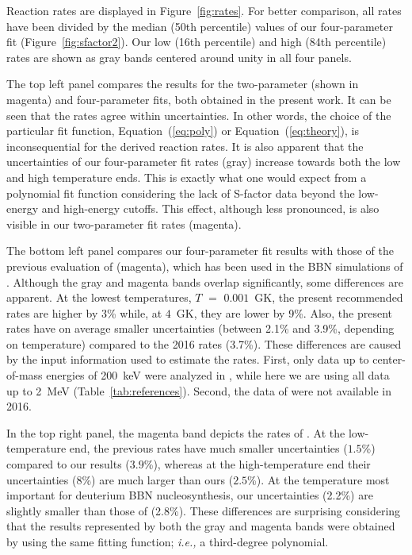 \documentclass[twocolumn]{aastex63}
\begin{document}
Reaction rates are displayed in Figure~\ref{fig:rates}. For better comparison, all rates have been divided by the median (50th percentile) values of our four-parameter fit (Figure~\ref{fig:sfactor2}). Our low (16th percentile) and high (84th percentile) rates are shown as gray bands centered around unity in all four panels. 

The top left panel compares the results for the two-parameter (shown in magenta) and four-parameter fits, both obtained in the present work. It can be seen that the rates agree within uncertainties. In other words, the choice of the particular fit function, Equation~(\ref{eq:poly}) or Equation~(\ref{eq:theory}), is inconsequential for the derived reaction rates. It is also apparent that the uncertainties of our four-parameter fit rates (gray) increase towards both the low and high temperature ends. This is exactly what one would expect from a polynomial fit function considering the lack of S-factor data beyond the low-energy and high-energy cutoffs. This effect, although less pronounced, is also visible in our two-parameter fit rates (magenta).

The bottom left panel compares our four-parameter fit results with those of the previous evaluation of \citet{iliadis16} (magenta), which has been used in the BBN simulations of \citet{Pitrou2018}. Although the gray and magenta bands overlap significantly, some differences are apparent. At the lowest temperatures, $T$ $=$ $0.001$~GK, the present recommended rates are higher by 3\% while, at $4$~GK, they are lower by 9\%. Also, the present rates have on average smaller uncertainties (between 2.1\% and 3.9\%, depending on temperature) compared to the 2016 rates (3.7\%). These differences are caused by the input information used to estimate the rates. First, only data up to center-of-mass energies of 200~keV were analyzed in \citet{iliadis16}, while here we are using all data up to 2~MeV (Table~\ref{tab:references}). Second, the data of \citet{Turkat21,Mossa20,Tisma:2019ug} were not available in 2016. 

In the top right panel, the magenta band depicts the rates of \citet{Mossa20}. At the low-temperature end, the previous rates have much smaller uncertainties ($1.5$\%) compared to our results ($3.9$\%), whereas at the high-temperature end their uncertainties ($8$\%) are much larger than ours ($2.5$\%). At the temperature most important for deuterium BBN nucleosynthesis, our uncertainties (2.2\%) are slightly smaller than those of \citet{Mossa20} (2.8\%). These differences are surprising considering that the results represented by both the gray and magenta bands were obtained by using the same fitting function; {\it i.e.,} a third-degree polynomial.
\end{document}
